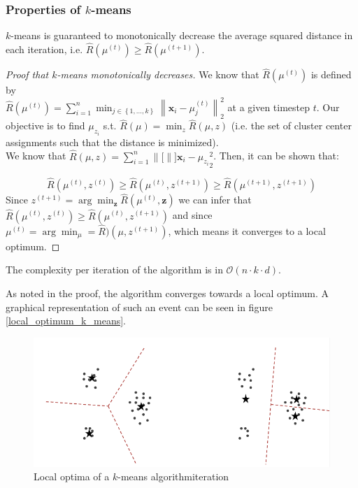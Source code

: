\documentclass[a4paper,10pt,twoside]{article}
\newcommand\norm[1]{\left\lVert#1\right\rVert}
\begin{document}
\subsubsection{Properties of $k$-means}

$k$-means is guaranteed to monotonically decrease the average squared distance in each iteration, i.e. $\hat{R}(\mu^{(t)})\geq\hat{R}(\mu^{(t+1)})$.

\begin{proof}[Proof that $k$-means monotonically decreases]
    We know that $\hat{R}(\mu^{(t)})$ is defined by \\
    $\hat{R}(\mu^{(t)})=\sum_{i=1}^{n}\min_{j\in\left\{1,\ldots, k\right\}}\norm{\mathbf{x}_i-\mu_j^{(t)}}_2^2$ at a given timestep $t$. Our objective is to find $\mu_{z_i}$ s.t. $\hat{R}(\mu)=\min_{z}\hat{R}(\mu, z)$ (i.e. the set of cluster center assignments such that the distance is minimized). \\

    We know that $\hat{R}(\mu,z)=\sum_{i=1}^{n}\norm[]{\mathbf{x}_i-\mu_{z_i}}_2^2$. Then, it can be shown that:


    \begin{equation*}
        \hat{R}(\mu^{(t)}, z^{(t)})\geq \hat{R}(\mu^{(t)}, z^{(t+1)})\geq \hat{R}(\mu^{(t+1)}, z^{(t+1)})
    \end{equation*}
    Since $z^{(t+1)}=\arg\min_{\mathbf{z}}\hat{R}(\mu^{(t)}, \mathbf{z})$ we can infer that $\hat{R}(\mu^{(t)}, z^{(t)})\geq \hat{R}(\mu^{(t)}, z^{(t+1)})$ and since $\mu^{(t)}=\arg\min_{\mu}=\hat{R})(\mu, z^{(t+1)})$, which means it converges to a local optimum.
\end{proof}

The complexity per iteration of the algorithm is in $\mathcal{O}(n\cdot k\cdot d)$.

As noted in the proof, the algorithm converges towards a local optimum. A graphical representation of such an event can be seen in figure \ref{local_optimum_k_means}.

\begin{figure}
    \centering
    \includegraphics[width=.5\textwidth]{figures/local_optimum_k_means.png}
    \caption{Local optima of a $k$-means algorithmiteration}
    \label{local_optimum_knn}
\end{figure}
\end{document}
